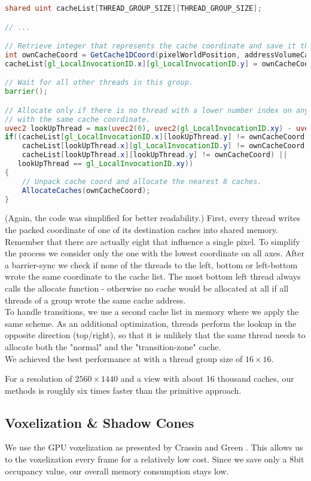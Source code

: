 \documentclass[thesis.tex]{subfiles}
\begin{document}
\begin{lstlisting}[language=GLSL]
shared uint cacheList[THREAD_GROUP_SIZE][THREAD_GROUP_SIZE];

// ...

// Retrieve integer that represents the cache coordinate and save it the shared memory.
int ownCacheCoord = GetCache1DCoord(pixelWorldPosition, addressVolumeCascade);
cacheList[gl_LocalInvocationID.x][gl_LocalInvocationID.y] = ownCacheCoord;

// Wait for all other threads in this group.
barrier();

// Allocate only if there is no thread with a lower number index on any axis
// with the same cache coordinate.
uvec2 lookUpThread = max(uvec2(0), uvec2(gl_LocalInvocationID.xy) - uvec2(1));
if((cacheList[gl_LocalInvocationID.x][lookUpThread.y] != ownCacheCoord && 
    cacheList[lookUpThread.x][gl_LocalInvocationID.y] != ownCacheCoord &&
    cacheList[lookUpThread.x][lookUpThread.y] != ownCacheCoord) ||
   lookUpThread == gl_LocalInvocationID.xy))
{
	// Unpack cache coord and allocate the nearest 8 caches.
	AllocateCaches(ownCacheCoord);
}
\end{lstlisting}
(Again, the code was simplified for better readability.)
First, every thread writes the packed coordinate of one of its destination caches into shared memory.
Remember that there are actually eight that influence a single pixel.
To simplify the process we consider only the one with the lowest coordinate on all axes.
After a barrier-sync we check if none of the threads to the left, bottom or left-bottom wrote the same coordinate to the cache list.
The most bottom left thread always calls the allocate function - otherwise no cache would be allocated at all if all threads of a group wrote the same cache address.
\\
To handle transitions, we use a second cache list in memory where we apply the same scheme.
As an additional optimization, threads perform the lookup in the opposite direction (top/right), so that it is unlikely that the same thread needs to allocate both the "normal" and the "transition-zone" cache.
\\
We achieved the best performance at with a thread group size of $16\times16$.

For a resolution of $2560\times1440$ and a view with about 16 thousand caches, our methods is roughly six times faster than the primitive approach.

\subsection{Voxelization \& Shadow Cones}
We use the GPU voxelization as presented by Crassin and Green \cite{bib:openglinsightsvoxel}.
This allows us to the voxelization every frame for a relatively low cost.
Since we save only a 8bit occupancy value, our overall memory consumption stays low.
\end{document}
